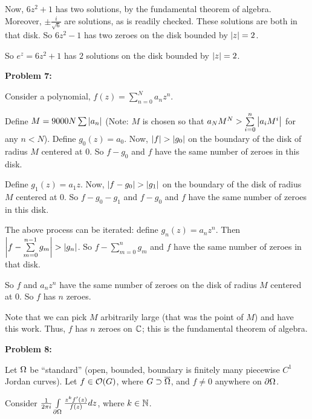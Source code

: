 \documentclass[a4paper,12pt]{article}
\begin{document}
Now, $6z^2 +1$ has two solutions, by the fundamental theorem of algebra. Moreover, $\pm \frac{i}{\sqrt{6}}$ are solutions, as is readily checked. These solutions are both in that disk. So $6z^2-1$ has two zeroes on the disk bounded by $\left\lvert z \right\rvert = 2$.

So  $e^z = 6z^2 +1$ has $2$ solutions on the disk bounded by $\left\lvert z \right\rvert = 2$.

\shunt

{\bf Problem 7:}

Consider a polynomial, $f(z) = \sum\limits_{n=0}^N a_nz^n$.

Define $M = 9000N \sum \limits \left\lvert a_n \right\rvert$ (Note: $M$ is chosen so that $a_NM^N > \sum\limits_{i=0}^n \left\lvert a_iM^i \right\rvert$ for any $n <N$). Define $g_0(z) = a_0$. Now, $\left\lvert f \right\rvert > \left\lvert g_0 \right\rvert$ on the boundary of the disk of radius $M$ centered at $0$. So $f-g_0$ and $f$ have the same number of zeroes in this disk.

Define $g_1(z) = a_1z$. Now, $\left\lvert f-g_0 \right\rvert > \left\lvert g_1 \right\rvert$ on the boundary of the disk of radius $M$ centered at $0$. So $f-g_0-g_1$ and $f-g_0$ and $f$ have the same number of zeroes in this disk.

The above process can be iterated: define $g_n(z) = a_nz^n$. Then $\left\lvert f-\sum\limits_{m=0}^{n-1} g_m \right\rvert > \left\lvert g_n \right\rvert$. So $f-\sum\limits_{m=0}^{n} g_m$ and $f$ have the same number of zeroes in that disk.

So $f$ and $a_nz^n$ have the same number of zeroes on the disk of radius $M$ centered at $0$. So $f$ has $n$ zeroes.

Note that we can pick $M$ arbitrarily large (that was the point of $M$) and have this work. Thus, $f$ has $n$ zeroes on $\mathbb{C}$; this is the fundamental theorem of algebra.

\shunt

{\bf Problem 8:}

Let $\Omega$ be ``standard'' (open, bounded, boundary is finitely many piecewise $C^1$ Jordan curves). Let $f \in \mathcal{O}(G)$, where $G \supset \overline{\Omega}$, and $f \neq 0$ anywhere on $\partial \Omega$.

Consider $\frac{1}{2\pi i} \int\limits_{\partial \Omega} \frac{z^k f'(z)}{f(z)} dz$, where $k \in \mathbb{N}$.

\shunt
\end{document}
